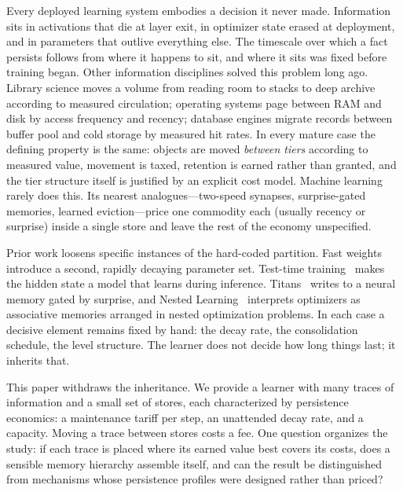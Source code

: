\documentclass[10pt,twocolumn]{article}
\theoremstyle{definition}
\begin{document}
Every deployed learning system embodies a decision it never made. Information sits in activations that die
at layer exit, in optimizer state erased at deployment, and in parameters that outlive everything else. The
timescale over which a fact persists follows from where it happens to sit, and where it sits was fixed
before training began. Other information disciplines solved this problem long ago. Library science moves a
volume from reading room to stacks to deep archive according to measured circulation; operating systems page
between {RAM} and disk by access frequency and recency; database engines migrate records between buffer pool
and cold storage by measured hit rates. In every mature case the defining property is the same: objects are
moved \emph{between tiers} according to measured value, movement is taxed, retention is earned rather than
granted, and the tier structure itself is justified by an explicit cost model. Machine learning rarely does
this. Its nearest analogues---two-speed synapses, surprise-gated memories, learned eviction---price one
commodity each (usually recency or surprise) inside a single store and leave the rest of the economy
unspecified.

Prior work loosens specific instances of the hard-coded partition. Fast weights~\citep{hinton1987fast,
ba2016using} introduce a second, rapidly decaying parameter set. Test-time training~\citep{sun2024testtime}
makes the hidden state a model that learns during inference. Titans~\citep{behrouz2024titans} writes to a
neural memory gated by surprise, and Nested Learning~\citep{behrouz2025nested} interprets optimizers as
associative memories arranged in nested optimization problems. In each case a decisive element remains fixed
by hand: the decay rate, the consolidation schedule, the level structure. The learner does not decide how
long things last; it inherits that.

This paper withdraws the inheritance. We provide a learner with many traces of information and a small set
of stores, each characterized by persistence economics: a maintenance tariff per step, an unattended decay
rate, and a capacity. Moving a trace between stores costs a fee. One question organizes the study: if each
trace is placed where its earned value best covers its costs, does a sensible memory hierarchy assemble
itself, and can the result be distinguished from mechanisms whose persistence profiles were designed rather
than priced?
\end{document}
